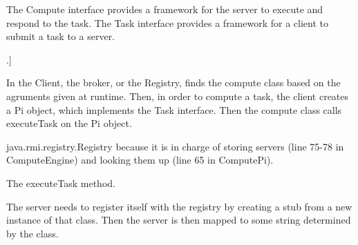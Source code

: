 \documentclass[12pt,letterpaper,boxed]{hmcpset}
\begin{document}
\begin{problem}
\end{problem}

The Compute interface provides a framework for the server to execute and respond to the task.
The Task interface provides a framework for a client to submit a task to a server. \newline \newline
\begin{problem}[2. The Compute interface extends the Remote interface but the Task interface does not. When a client creates these objects, explain how they get sent to the server? [Hint: Slide\# 9].]
\end{problem}

In the Client, the broker, or the Registry, finds the compute class based on the agruments given at runtime. Then, in order to compute a task, the client creates a Pi object, which implements the Task interface. Then the compute class calls executeTask on the Pi object. \newline \newline
\begin{problem}
\end{problem}

java.rmi.registry.Registry because it is in charge of storing servers (line 75-78 in ComputeEngine) and looking them up (line 65 in ComputePi).
\newline \newline
\begin{problem}
\end{problem}

The executeTask method. \newline\newline
\begin{problem}
\end{problem}

The server needs to register itself with the registry by creating a stub from a new instance of that class. Then the server is then mapped to some string determined by the class. \newline\newline\newline
\begin{problem}
\end{problem}
\end{document}
